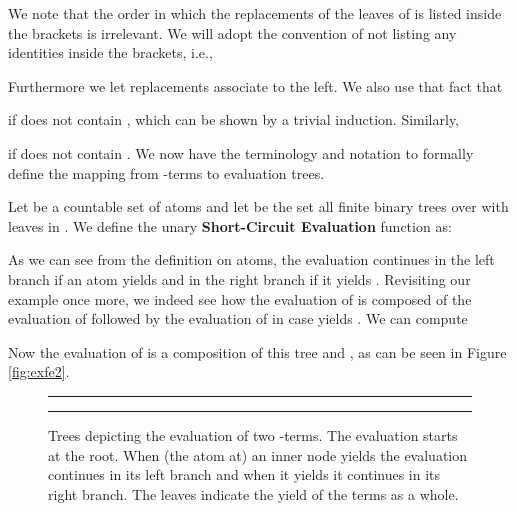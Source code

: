 We note that the order in which the replacements of the leaves of  is listed
inside the brackets is irrelevant. We will adopt the convention of not listing
any identities inside the brackets, i.e.,

Furthermore we let replacements associate to the left. We also use that fact
that

if  does not contain , which can be shown by a trivial induction.
Similarly,

if  does not contain .  We now have the terminology and notation to
formally define the mapping from -terms to evaluation trees.

\begin{definition}
Let  be a countable set of atoms and let  be the set all finite binary
trees over  with leaves in . We define the unary
\textbf{Short-Circuit Evaluation} function  as:

\end{definition}
As we can see from the definition on atoms, the evaluation continues in the
left branch if an atom yields  and in the right branch if it yields
. Revisiting our example once more, we indeed see how the evaluation of
 is composed of the evaluation of  followed by the evaluation
of  in case  yields . We can compute

Now the evaluation of  is a composition of this
tree and , as can be seen in Figure
\ref{fig:exfe2}.

\begin{figure}[thbp]
\hrule
\centering
{}
\qquad
{}
\vspace{1em}
\hrule
\vspace{1em}
\caption{Trees depicting the evaluation of two -terms. The evaluation
starts at the root. When (the atom at) an inner node yields  the
evaluation continues in its left branch and when it yields  it
continues in its right branch. The leaves indicate the yield of the terms as a
whole.}
\label{fig:exse}
\end{figure}

